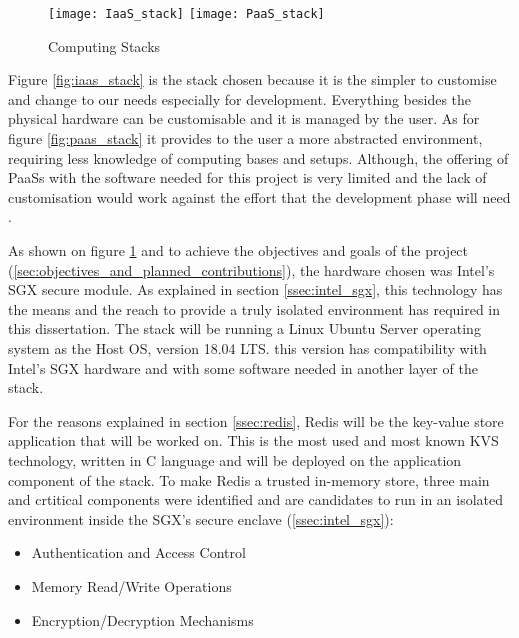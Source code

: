 \begin{figure}[htbp]
  \centering
    {\texttt{[image: IaaS\_stack]}}%
    \hspace{5em}
    {\texttt{[image: PaaS\_stack]}}%
  \caption{Computing Stacks}
  \label{fig:computing_stacks}
\end{figure}

Figure \ref{fig:iaas_stack} is the stack chosen because it is the simpler to customise and change to our needs especially for development. Everything besides the physical hardware can be customisable and it is managed by the user. As for figure \ref{fig:paas_stack} it provides to the user a more abstracted environment, requiring less knowledge of computing bases and setups. Although, the offering of \glspl{PaaS} with the software needed for this project is very limited and the lack of customisation would work against the effort that the development phase will need \cite{computing_stacks:1}.

As shown on figure \ref{fig:computing_stacks} and to achieve the objectives and goals of the project (\ref{sec:objectives_and_planned_contributions}), the hardware chosen was Intel's \gls{SGX} secure module. As explained in section \ref{ssec:intel_sgx}, this technology has the means and the reach to provide a truly isolated environment has required in this dissertation. The stack will be running a Linux Ubuntu Server \cite{ubuntu_server:1} operating system as the Host \gls{OS}, version 18.04 LTS. this version has compatibility with Intel's \gls{SGX} hardware and with some software needed in another layer of the stack.

For the reasons explained in section \ref{ssec:redis}, Redis will be the key-value store application that will be worked on. This is the most used and most known \gls{KVS} technology, written in C language and will be deployed on the application component of the stack. To make Redis a trusted in-memory store, three main and crtitical components were identified and are candidates to run in an isolated environment inside the \gls{SGX}'s secure enclave (\ref{ssec:intel_sgx}):

\begin{itemize}
	\item Authentication and Access Control
	\item Memory Read/Write Operations
	\item Encryption/Decryption Mechanisms
\end{itemize}

